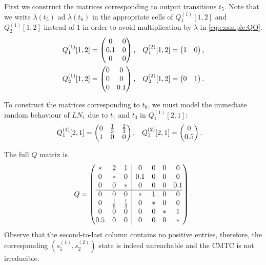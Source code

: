 \documentclass[a4paper,11pt,twoside,openright]{memoir}
\newcommand*{\LN}{\textit{LN}}
\theoremstyle{my}
\begin{document}
First we construct the matrices corresponding to output transitions
$t_5$. Note that we write $\lambda(t_5)$ ad $\lambda(t_6)$ in the
appropriate cells of $Q^{(1)}_1[1, 2]$ and $Q^{(1)}_2[1, 2]$ instead
of $1$ in order to avoid multiplication by $\lambda$ in
\eqref{eq:example:QO}.
\begin{align}
  Q^{(1)}_1[1, 2] &= \begin{pmatrix}
    0 & 0 \\
    0.1 & 0 \\
    0 & 0
  \end{pmatrix} \text, &
  Q^{(2)}_1[1, 2] &= \begin{pmatrix}
    1 & 0
  \end{pmatrix} \text, \\
  Q^{(1)}_2[1, 2] &= \begin{pmatrix}
    0 & 0 \\
    0 & 0 \\
    0 & 0.1
  \end{pmatrix} \text, &
  Q^{(2)}_2[1, 2] &= \begin{pmatrix}
    0 & 1
  \end{pmatrix} \text. \\
\end{align}

To construct the matrices corresponding to $t_8$, we must model the
immediate random behaviour of $\LN_1$ due to $t_1$ and $t_3$ in
$Q^{(1)}_1[2, 1]$:
\begin{align}
  Q^{(1)}_1[2, 1] &= \begin{pmatrix}
    0 & \frac{1}{3} & \frac{2}{3} \\
    1 & 0 & 0
  \end{pmatrix} \text, &
  Q^{(2)}_1[2, 1] &= \begin{pmatrix}
    0 \\
    0.5
  \end{pmatrix} \text.
\end{align}

The full $Q$ matrix is
\begin{equation}
  Q = \left( \begin{array}{@{}ccc|cccc@{}}
               * & 2 & 1 & 0 & 0 & 0 & 0 \\
               0 & * & 0 & 0.1 & 0 & 0 & 0 \\
               0 & 0 & * & 0 & 0 & 0 & 0.1 \\
               \hline
               0 & 0 & 0 & * & 1 & 0 & 0 \\
               0 & \frac{1}{6} & \frac{1}{3} & 0 & * & 0 & 0 \\
               0 & 0 & 0 & 0 & 0 & * & 1 \\
               0.5 & 0 & 0 & 0 & 0 & 0 & * \\
             \end{array} \right) \text.
\end{equation}
Observe that the second-to-last column contains no positive entries,
therefore, the corresponding $(s^{(1)}_5, s^{(2)}_2)$ state is indeed
unreachable and the CMTC is not irreducible.
\end{document}
